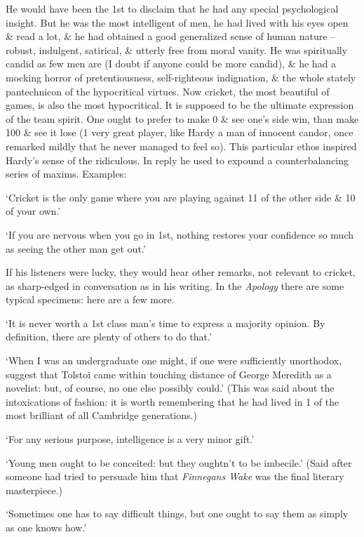 \documentclass{article}
\numberwithin{equation}{section}
\begin{document}
He would have been the 1st to disclaim that he had any special psychological insight. But he was the most intelligent of men, he had lived with his eyes open \& read a lot, \& he had obtained a good generalized sense of human nature -- robust, indulgent, satirical, \& utterly free from moral vanity. He was spiritually candid as few men are (I doubt if anyone could be more candid), \& he had a mocking horror of pretentiousness, self-righteous indignation, \& the whole stately pantechnicon of the hypocritical virtues. Now cricket, the most beautiful of games, is also the most hypocritical. It is supposed to be the ultimate expression of the team spirit. One ought to prefer to make 0 \& see one's side win, than make 100 \& see it lose (1 very great player, like Hardy a man of innocent candor, once remarked mildly that he never managed to feel so). This particular ethos inspired Hardy's sense of the ridiculous. In reply he used to expound a counterbalancing series of maxims. Examples:

`Cricket is the only game where you are playing against 11 of the other side \& 10 of your own.'

`If you are nervous when you go in 1st, nothing restores your confidence so much as seeing the other man get out.'

If his listeners were lucky, they would hear other remarks, not relevant to cricket, as sharp-edged in conversation as in his writing. In the \textit{Apology} there are some typical specimens: here are a few more.

`It is never worth a 1st class man's time to express a majority opinion. By definition, there are plenty of others to do that.'

`When I was an undergraduate one might, if one were sufficiently unorthodox, suggest that Tolstoi came within touching distance of George Meredith as a novelist: but, of course, no one else possibly could.' (This was said about the intoxications of fashion: it is worth remembering that he had lived in 1 of the most brilliant of all Cambridge generations.)

`For any serious purpose, intelligence is a very minor gift.'

`Young men ought to be conceited: but they oughtn't to be imbecile.' (Said after someone had tried to persuade him that \textit{Finnegans Wake} was the final literary masterpiece.)

`Sometimes one has to say difficult things, but one ought to say them as simply as one knows how.'
\end{document}
